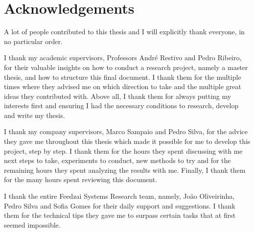 \chapter*{Acknowledgements}

A lot of people contributed to this thesis and I will explicitly thank everyone, in no particular order.

I thank my academic supervisors, Professors André Restivo and Pedro Ribeiro, for their valuable insights on how to conduct a research project, namely a master thesis, and how to structure this final document. I thank them for the multiple times where they advised me on which direction to take and the multiple great ideas they contributed with. Above all, I thank them for always putting my interests first and ensuring I had the necessary conditions to research, develop and write my thesis.

I thank my company supervisors, Marco Sampaio and Pedro Silva, for the advice they gave me throughout this thesis which made it possible for me to develop this project, step by step. I thank them for the hours they spent discussing with me next steps to take, experiments to conduct, new methods to try and for the remaining hours they spent analyzing the results with me. Finally, I thank them for the many hours spent reviewing this document.

I thank the entire Feedzai Systems Research team, namely, João Oliveirinha, Pedro Silva and Sofia Gomes for their daily support and suggestions. I thank them for the technical tips they gave me to surpass certain tasks that at first seemed impossible. 

\vspace{10mm}
